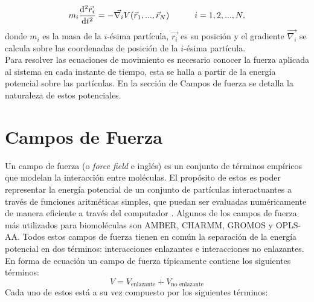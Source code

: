 \begin{equation}\label{eq:1}
m_i\frac{\mathrm{d}^2\vec{r_i}}{\mathrm{d}t^2}=-\vec{\nabla_i}V(\vec{r}_1,...,\vec{r}_N) \text{\hspace{30pt}}i=1,2,...,N,
\end{equation}
donde $m_i$ es la masa de la $i$-\'{e}sima part\'{i}cula, $\vec{r_i}$ es su posici\'{o}n y el gradiente $ \vec{\nabla_i}$ se calcula sobre las coordenadas de posici\'{o}n de la $i$-\'{e}sima part\'{i}cula.\\

Para resolver las ecuaciones de movimiento es necesario conocer la fuerza aplicada al sistema en cada instante de tiempo, esta se halla a partir de la energ\'{i}a potencial sobre las part\'{i}culas. En la secci\'{o}n de Campos de fuerza se detalla la naturaleza de estos potenciales.
\section{Campos de Fuerza}
Un campo de fuerza (o \textit{force field} e ingl\'{e}s) es un conjunto de t\'{e}rminos emp\'{i}ricos que modelan la interacci\'{o}n entre mol\'{e}culas. El prop\'{o}sito de estos es poder representar la energ\'{i}a potencial de un conjunto de part\'{i}culas interactuantes a trav\'{e}s de funciones aritm\'{e}ticas simples, que puedan ser evaluadas num\'{e}ricamente de manera eficiente a trav\'{e}s del computador \cite{Kukol2014MolecularEdition}. Algunos de los campos de fuerza m\'{a}s utilizados para biomol\'{e}culas son AMBER, CHARMM, GROMOS y OPLS-AA. Todos estos campos de fuerza tienen en com\'{u}n la separaci\'{o}n de la energ\'{i}a potencial en dos t\'{e}rminos: interacciones enlazantes e interacciones no enlazantes. En forma de ecuaci\'{o}n un campo de fuerza t\'{i}picamente contiene los siguientes t\'{e}rminos:
\begin{equation}\label{eq:2}
    V=V_{\text{enlazante}}+V_{\text{no enlazante}}
\end{equation}
Cada uno de estos est\'{a} a su vez compuesto por los siguientes t\'{e}rminos:
